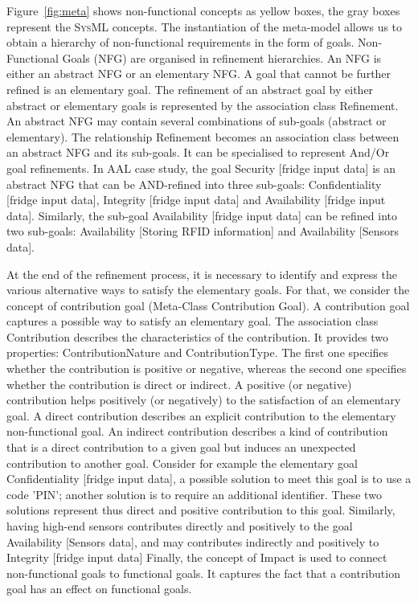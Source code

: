\documentclass[10pt, conference, compsocconf]{IEEEtran}
\def\sysml{\textsc{SysML}}
\newcommand{\Myfig}[1]{Figure~\ref{fig:#1}}
\begin{document}
\Myfig{meta} shows non-functional concepts as yellow boxes, the gray boxes represent the \sysml{} concepts. The instantiation of the meta-model allows us to obtain a hierarchy of non-functional requirements in the form of goals. Non-Functional Goals (NFG) are organised in refinement hierarchies. An NFG is either an abstract NFG or an elementary NFG. A goal that cannot be further refined is
an elementary goal. The refinement of an abstract goal by either abstract or elementary goals is represented by the association class Refinement. An abstract NFG may contain several combinations of sub-goals (abstract or elementary). The relationship Refinement
becomes an association class between an abstract NFG and its sub-goals. It can be specialised to represent And/Or
goal refinements. 
In AAL case study, the goal Security [fridge input data] is an abstract NFG that can be AND-refined into three sub-goals: Confidentiality [fridge input data], Integrity [fridge input data] and Availability [fridge input data]. Similarly, the sub-goal Availability [fridge input data] can be refined into two sub-goals: Availability [Storing RFID information] and Availability [Sensors data].

At the end of the refinement process, it is necessary to identify and express the various alternative ways to satisfy the elementary goals. For that, we consider the concept of contribution goal (Meta-Class Contribution Goal). A contribution goal captures a possible way to satisfy an elementary goal. The association class Contribution describes the characteristics of the contribution. It provides two properties: ContributionNature and ContributionType. The first one specifies whether the contribution is positive or negative, whereas the second one specifies whether the contribution is direct or indirect. 
A positive (or negative) contribution helps positively (or negatively) to the satisfaction of an elementary goal. 
A direct contribution describes an explicit contribution to the elementary non-functional goal. An indirect contribution describes a kind of contribution that is a direct contribution to a given goal but induces an unexpected contribution to another goal.
Consider for example the elementary goal Confidentiality [fridge input data], a possible solution to meet this goal is to use a code 'PIN'; another solution is to require an additional identifier. These two solutions represent thus direct and positive contribution to this goal. Similarly, having high-end sensors contributes directly and positively to the goal Availability [Sensors data], and may contributes indirectly and positively to Integrity [fridge input data]
Finally, the concept of Impact is used to connect non-functional goals to functional goals. It captures the fact that a contribution goal has an effect on functional goals.
\end{document}
